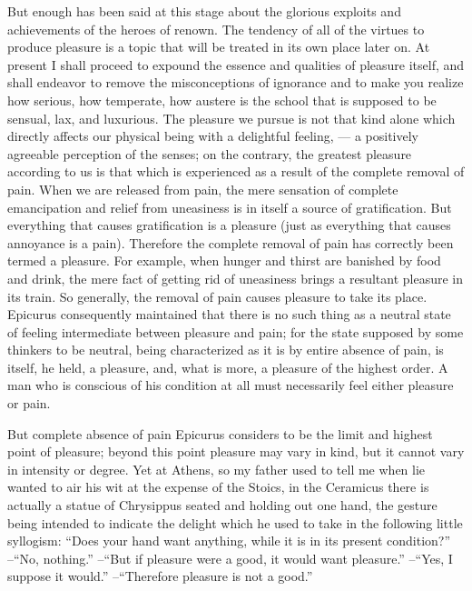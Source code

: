 {But enough has been said at this stage about the glorious exploits and achievements of the heroes of renown. The tendency of all of the virtues to produce pleasure is a topic that will be treated in its own place later on. At present I shall proceed to expound the essence and qualities of pleasure itself, and shall endeavor to remove the misconceptions of ignorance and to make you realize how serious, how temperate, how austere is the school that is supposed to be sensual, lax, and luxurious. The pleasure we pursue is not that kind alone which directly affects our physical being with a delightful feeling, --- a positively agreeable perception of the senses; on the contrary, the greatest pleasure according to us is that which is experienced as a result of the complete removal of pain. When we are released from pain, the mere sensation of complete emancipation and relief from uneasiness is in itself a source of gratification.
%
But everything that causes gratification is a pleasure (just as everything that causes annoyance is a pain). Therefore the complete removal of pain has correctly been termed a pleasure. For example, when hunger and thirst are banished by food and drink, the mere fact of getting rid of uneasiness brings a resultant pleasure in its train. So generally, the removal of pain causes pleasure to take its place.
%
Epicurus consequently maintained that there is no such thing as a neutral state of feeling intermediate between pleasure and pain; for the state supposed by some thinkers to be neutral, being characterized as it is by entire absence of pain, is itself, he held, a pleasure, and, what is more, a pleasure of the highest order. A man who is conscious of his condition at all must necessarily feel either pleasure or pain.

But complete absence of pain Epicurus considers to be the limit and highest point of pleasure; beyond this point pleasure may vary in kind, but it cannot vary in intensity or degree. Yet at Athens, so my father used to tell me when lie wanted to air his wit at the expense of the Stoics, in the Ceramicus there is actually a statue of Chrysippus seated and holding out one hand, the gesture being intended to indicate the delight which he used to take in the following little syllogism:
``Does your hand want anything, while it is in its present condition?''
--``No, nothing.''
--``But if pleasure were a good, it would want pleasure.''
--``Yes, I suppose it would.''
--``Therefore pleasure is not a good.''

}
